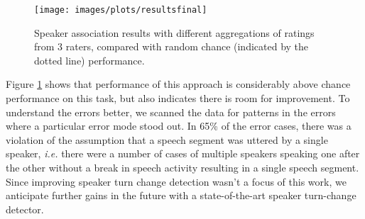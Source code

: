 \documentclass[a4paper]{article}
\begin{document}
\begin{figure}[t]
  \texttt{[image: images/plots/resultsfinal]}
  \caption{Speaker association results with different aggregations of ratings from 3 raters, compared with random chance (indicated by the dotted line) performance.}
  \label{fig:results}
\end{figure}

Figure \ref{fig:results} shows that performance of this approach is considerably above chance performance on this task, but also indicates there is room for improvement. To understand the errors better, we scanned the data for patterns in the errors where a particular error mode stood out. In 65\% of the error cases, there was a violation of the assumption that a speech segment was uttered by a single speaker, {\it i.e.} there were a number of cases of multiple speakers speaking one after the other without a break in speech activity resulting in a single speech segment. Since improving speaker turn change detection wasn't a focus of this work, we anticipate further gains in the future with a state-of-the-art speaker turn-change detector. 

\end{document}
